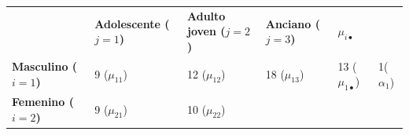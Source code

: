 \documentclass[]{book}
\theoremstyle{definition}
\theoremstyle{definition}
\theoremstyle{definition}
\theoremstyle{remark}
\begin{document}
\begin{longtable}[]{@{}llllll@{}}
\midrule
\endhead
\begin{minipage}[t]{0.12\columnwidth}\raggedright
\strut
\end{minipage} & \begin{minipage}[t]{0.19\columnwidth}\raggedright
\textbf{Adolescente (\(j = 1\))}\strut
\end{minipage} & \begin{minipage}[t]{0.13\columnwidth}\raggedright
\textbf{Adulto joven (\(j = 2\))}\strut
\end{minipage} & \begin{minipage}[t]{0.12\columnwidth}\raggedright
\textbf{Anciano (\(j = 3\))}\strut
\end{minipage} & \begin{minipage}[t]{0.16\columnwidth}\raggedright
\textbf{\(\mu_{i\bullet}\)}\strut
\end{minipage} & \begin{minipage}[t]{0.11\columnwidth}\raggedright
\strut
\end{minipage}\tabularnewline
\begin{minipage}[t]{0.12\columnwidth}\raggedright
\textbf{Masculino (\(i = 1\))}\strut
\end{minipage} & \begin{minipage}[t]{0.19\columnwidth}\raggedright
9 (\(\mu_{11}\))\strut
\end{minipage} & \begin{minipage}[t]{0.13\columnwidth}\raggedright
12 (\(\mu_{12}\))\strut
\end{minipage} & \begin{minipage}[t]{0.12\columnwidth}\raggedright
18 (\(\mu_{13}\))\strut
\end{minipage} & \begin{minipage}[t]{0.16\columnwidth}\raggedright
13 (\(\mu_{1 \bullet}\))\strut
\end{minipage} & \begin{minipage}[t]{0.11\columnwidth}\raggedright
1( \(\alpha_{1}\))\strut
\end{minipage}\tabularnewline
\begin{minipage}[t]{0.12\columnwidth}\raggedright
\textbf{Femenino (\(i = 2\))}\strut
\end{minipage} & \begin{minipage}[t]{0.19\columnwidth}\raggedright
9 (\(\mu_{21}\))\strut
\end{minipage} & \begin{minipage}[t]{0.13\columnwidth}\raggedright
10 (\(\mu_{22}\))\strut

\end{minipage}
\end{longtable}
\end{document}
